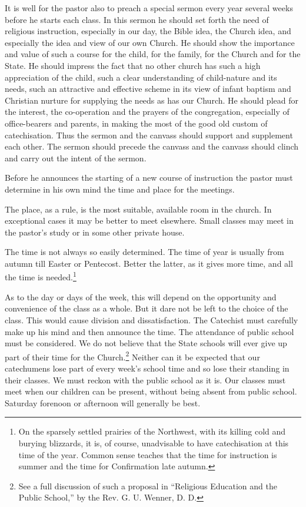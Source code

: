  It is well for the pastor also to preach a special sermon every year several weeks before he starts each class. In this sermon he should set forth the need of religious instruction, especially in our day, the Bible idea, the Church idea, and especially the idea and view of our own Church. He should show the importance and value of such a course for the child, for the family, for the Church and for the State. He should impress the fact that no other church has such a high appreciation of the child, such a clear understanding of child-nature and its needs, such an attractive and effective scheme in its view of infant baptism and Christian nurture for supplying the needs as has our Church. He should plead for the interest, the co-operation and the prayers of the congregation, especially of office-bearers and parents, in making the most of the good old custom of catechisation. Thus the sermon and the canvass should support and supplement each
other. The sermon should precede the canvass and the canvass should clinch and carry out the intent of the sermon.

Before he announces the starting of a new course of instruction the pastor must determine in his own mind the time and place for the meetings.

The place, as a rule, is the most suitable, available room in the church. In exceptional cases it may be better to meet elsewhere. Small classes may meet in the pastor’s study or in some other private house.

The time is not always so easily determined. The time of year is usually from autumn till Easter or Pentecost. Better the latter, as it gives more time, and all the time is needed.\footnote{On the sparsely settled prairies of the Northwest, with its killing cold and burying blizzards, it is, of course, unadvisable to have catechisation at this time of the year. Common sense teaches that the time for instruction is summer and the time for Confirmation late autumn.}

As to the day or days of the week, this will depend on the opportunity and convenience of the class as a whole. But it dare not be left to the choice of the class. This would cause division and dissatisfaction. The Catechist must carefully make up his mind and then announce the time. The attendance of public school must be considered. We do not believe that the State schools will ever give up part of their time for the Church.\footnote{See a full discussion of such a proposal in “Religious Education and the Public School,” by the Rev. G. U. Wenner, D. D.} Neither can
it be expected that our catechumens lose part of every week’s school time and so lose their standing in their classes. We must reckon with the public school as it is. Our classes must meet when our children can be present, without being absent from public school. Saturday forenoon or afternoon will generally be best.

